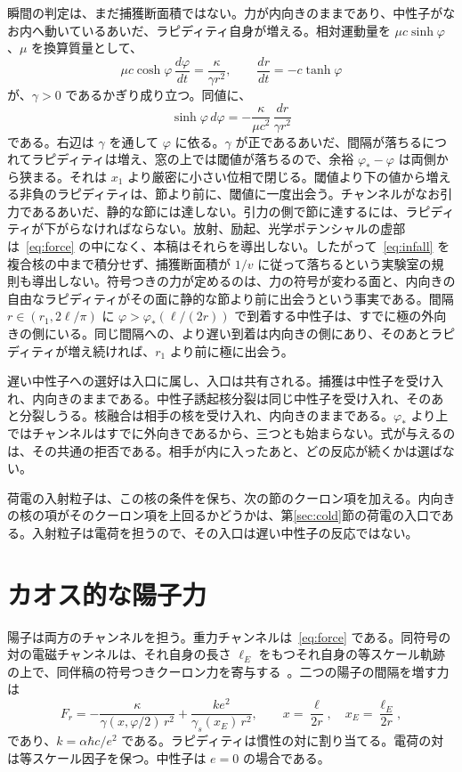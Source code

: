 \documentclass[a4paper]{article}
\begin{document}
瞬間の判定は、まだ捕獲断面積ではない。力が内向きのままであり、中性子がなお内へ動いているあいだ、ラピディティ自身が増える。相対運動量を \(\mu c\sinh\varphi\)、\(\mu\) を換算質量として、
\begin{equation}
\label{eq:infall}
\mu c\cosh\varphi\,\frac{d\varphi}{dt}
  =\frac{\kappa}{\gamma r^{2}},
\qquad
\frac{dr}{dt}=-c\tanh\varphi
\end{equation}
が、\(\gamma>0\) であるかぎり成り立つ。同値に、
\[
\sinh\varphi\,d\varphi
  =-\frac{\kappa}{\mu c^{2}}\,\frac{dr}{\gamma r^{2}}
\]
である。右辺は \(\gamma\) を通して \(\varphi\) に依る。\(\gamma\) が正であるあいだ、間隔が落ちるにつれてラピディティは増え、窓の上では閾値が落ちるので、余裕 \(\varphi_*-\varphi\) は両側から狭まる。それは \(x_1\) より厳密に小さい位相で閉じる。閾値より下の値から増える非負のラピディティは、節より前に、閾値に一度出会う。チャンネルがなお引力であるあいだ、静的な節には達しない。引力の側で節に達するには、ラピディティが下がらなければならない。放射、励起、光学ポテンシャルの虚部は~\eqref{eq:force} の中になく、本稿はそれらを導出しない。したがって~\eqref{eq:infall} を複合核の中まで積分せず、捕獲断面積が \(1/v\) に従って落ちるという実験室の規則も導出しない。符号つきの力が定めるのは、力の符号が変わる面と、内向きの自由なラピディティがその面に静的な節より前に出会うという事実である。間隔 \(r\in(r_1,2\ell/\pi)\) に \(\varphi>\varphi_*(\ell/(2r))\) で到着する中性子は、すでに極の外向きの側にいる。同じ間隔への、より遅い到着は内向きの側にあり、そのあとラピディティが増え続ければ、\(r_1\) より前に極に出会う。

遅い中性子への選好は入口に属し、入口は共有される。捕獲は中性子を受け入れ、内向きのままである。中性子誘起核分裂は同じ中性子を受け入れ、そのあと分裂しうる。核融合は相手の核を受け入れ、内向きのままである。\(\varphi_*\) より上ではチャンネルはすでに外向きであるから、三つとも始まらない。式が与えるのは、その共通の拒否である。相手が内に入ったあと、どの反応が続くかは選ばない。

荷電の入射粒子は、この核の条件を保ち、次の節のクーロン項を加える。内向きの核の項がそのクーロン項を上回るかどうかは、第\ref{sec:cold}節の荷電の入口である。入射粒子は電荷を担うので、その入口は遅い中性子の反応ではない。

\section{カオス的な陽子力}
\label{sec:proton}

陽子は両方のチャンネルを担う。重力チャンネルは~\eqref{eq:force} である。同符号の対の電磁チャンネルは、それ自身の長さ \(\ell_E\) をもつそれ自身の等スケール軌跡の上で、同伴稿の符号つきクーロン力を寄与する~\cite{dst-shell}。二つの陽子の間隔を増す力は
\begin{equation}
\label{eq:two-channel}
F_r
  =-\frac{\kappa}{\gamma(x,\varphi/2)\,r^{2}}
  +\frac{k e^{2}}{\gamma_s(x_E)\,r^{2}},
\qquad
x=\frac{\ell}{2r},
\quad
x_E=\frac{\ell_E}{2r},
\end{equation}
であり、\(k=\alpha\hbar c/e^{2}\) である。ラピディティは慣性の対に割り当てる。電荷の対は等スケール因子を保つ。中性子は \(e=0\) の場合である。
\end{document}
